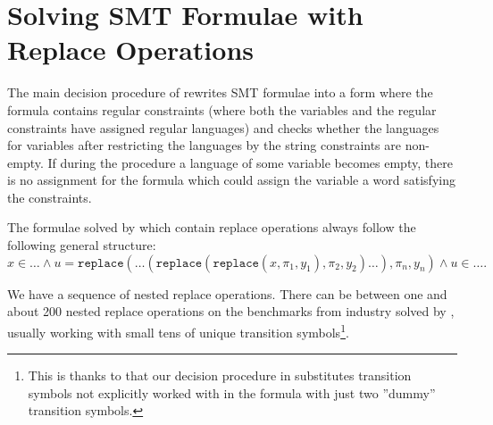 \section{Solving SMT Formulae with Replace Operations}
\label{sec:string_solving_with_replace}

The main decision procedure of \noodler rewrites SMT formulae into a form where the formula contains regular constraints (where both the variables and the regular constraints have assigned regular languages) and \noodler checks whether the languages for variables after restricting the languages by the string constraints are non-empty.
If during the procedure a language of some variable becomes empty, there is no assignment for the formula which could assign the variable a word satisfying the constraints.

The formulae solved by \noodler which contain replace operations always follow the following general structure:
$$ x \in \ldots \land u = \texttt{replace}(\ldots (\texttt{replace}(\texttt{replace}(x, \pi_1, y_1), \pi_2, y_2)\ldots), \pi_n, y_n) \land u \in \ldots \text{.}$$

We have a sequence of nested replace operations.
There can be between one and about 200 nested replace operations on the benchmarks from industry solved by \noodler, usually working with small tens of unique transition symbols\footnote{This is thanks to that our decision procedure in \noodler substitutes transition symbols not explicitly worked with in the formula with just two ''dummy'' transition symbols.}.

